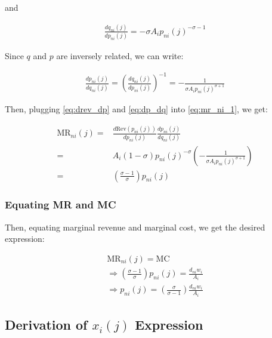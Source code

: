 \documentclass[10pt]{article}
\begin{document}
and 

\begin{align}
    \frac{d q_{ni}(j)}{d p_{n i}(j)} = -\sigma A_i p_{n i}(j)^{-\sigma-1}
\end{align}

Since $q$ and $p$ are inversely related,
we can write:

\begin{align}
    \frac{d p_{n i}(j)}{d q_{ni}(j)} = \left(\frac{d q_{ni}(j)}{d p_{n i}(j)}\right)^{-1} = -\frac{1}{\sigma A_i p_{n i}(j)^{\sigma+1}} \label{eq:dp_dq}
\end{align}

Then, plugging 
\eqref{eq:drev_dp} and \eqref{eq:dp_dq} into \eqref{eq:mr_ni_1}, we get:

\begin{align}
    \text{MR}_{n i}(j) = &\frac{d \text{Rev}(p_{n i}(j))}{dp_{n i}(j)} \frac{d p_{n i}(j)}{d q_{ni}(j)}  \\
    = & A_i (1-\sigma) p_{n i}(j)^{-\sigma} \left(-\frac{1}{\sigma A_i p_{n i}(j)^{\sigma+1}}\right) \\
    = & \left(\frac{\sigma - 1}{\sigma}\right) p_{n i}(j)
\end{align}


\subsubsection{Equating MR and MC}

Then, equating marginal revenue and marginal cost, we get
the desired expression:

\begin{align}
    \text{MR}_{n i}(j) = \text{MC} \\
    \Rightarrow \left(\frac{\sigma - 1}{\sigma}\right) p_{n i}(j) = \frac{d_{ni} w_i}{A_i} \\
    \Rightarrow p_{n i}(j) = \left(\frac{\sigma}{\sigma-1}\right) \frac{d_{ni} w_i}{A_i}
\end{align}


\subsection{Derivation of $x_i(j)$ Expression}
\label{sec:eq_output_xij}
\end{document}
